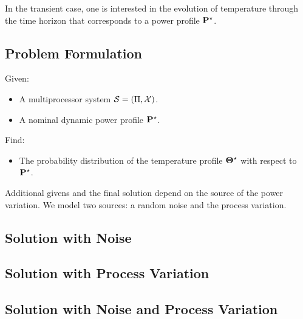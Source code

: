 In the transient case, one is interested in the evolution of temperature through the time horizon that corresponds to a power profile $\mathbf{P}^\star$.

\subsection{Problem Formulation}
Given:
\begin{itemize}
  \item A multiprocessor system $\mathcal{S} = (\Pi, \mathcal{X})$.
  \item A nominal dynamic power profile $\mathbf{P}^\star$.
\end{itemize}

Find:
\begin{itemize}
  \item The probability distribution of the temperature profile $\mathbf{\Theta}^\star$ with respect to $\mathbf{P}^\star$.
\end{itemize}

Additional givens and the final solution depend on the source of the power variation. We model two sources: a random noise and the process variation.

\subsection{Solution with Noise} 


\subsection{Solution with Process Variation} 


\subsection{Solution with Noise and Process Variation}

